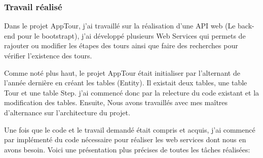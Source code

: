\documentclass[12pt]{article}
\begin{document}
\subsubsection{Travail réalisé}

Dans le projet AppTour, j'ai travaillé sur la réalisation d'une API web (Le back-end pour le bootstrapt), j'ai développé plusieurs Web Services qui permets de rajouter ou modifier les étapes des tours ainsi que faire des recherches pour vérifier l’existence des tours. 

Comme noté plus haut, le projet AppTour était initialiser par l'alternant de l'année dernière en créant les tables (Entity). Il existait deux tables, une table Tour et une table Step. j'ai commencé donc par la relecture du code existant et la modification des tables.
Ensuite, Nous avons travaillés avec mes maîtres d'alternance sur l'architecture du projet.

Une fois que le code et le travail demandé était compris et acquis, j'ai commencé par implémenté du code nécessaire pour réaliser les web services dont nous en avons besoin. Voici une présentation plus précises de toutes les tâches réalisées:   
\end{document}
